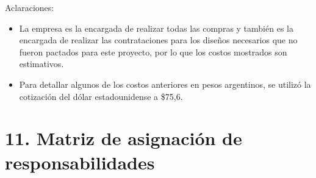 \documentclass[11pt]{charter}
\begin{document}
Aclaraciones:
\begin{itemize}
\item La empresa es la encargada de realizar todas las compras y también es la encargada de realizar las contrataciones para los diseños necesarios que no fueron pactados para este proyecto, por lo que los costos mostrados son estimativos.
\item Para detallar algunos de los costos anteriores en pesos argentinos, se utilizó la cotización del dólar estadounidense a \$75,6.
\end{itemize}

\newpage

\section{11. Matriz de asignación de responsabilidades}
\label{sec:responsabilidades}
\end{document}
